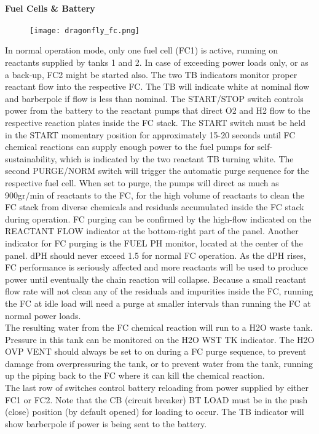 \documentclass[Orbiter User Manual.tex]{subfiles}
\begin{document}
\paragraph{Fuel Cells \& Battery}

\begin{figure}[H]
  \centering
  \texttt{[image: dragonfly\_fc.png]}
\end{figure}

\noindent
In normal operation mode, only one fuel cell (FC1) is active, running on reactants supplied by tanks 1 and 2. In case of exceeding power loads only, or as a back-up, FC2 might be started also. The two TB indicators monitor proper reactant flow into the respective FC. The TB will indicate white at nominal flow and barberpole if flow is less than nominal. The START/STOP switch controls power from the battery to the reactant pumps that direct O2 and H2 flow to the respective reaction plates inside the FC stack. The START switch must be held in the START momentary position for approximately 15-20 seconds until FC chemical reactions can supply enough power to the fuel pumps for self-sustainability, which is indicated by the two reactant TB turning white. The second PURGE/NORM switch will trigger the automatic purge sequence for the respective fuel cell. When set to purge, the pumps will direct as much as 900gr/min of reactants to the FC, for the high volume of reactants to clean the FC stack from diverse chemicals and residuals accumulated inside the FC stack during operation. FC purging can be confirmed by the high-flow indicated on the REACTANT FLOW indicator at the bottom-right part of the panel. Another indicator for FC purging is the FUEL PH monitor, located at the center of the panel. dPH should never exceed 1.5 for normal FC operation. As the dPH rises, FC performance is seriously affected and more reactants will be used to produce power until eventually the chain reaction will collapse. Because a small reactant flow rate will not clean any of the residuals and impurities inside the FC, running the FC at idle load will need a purge at smaller intervals than running the FC at normal power loads.\\
The resulting water from the FC chemical reaction will run to a H2O waste tank. Pressure in this tank can be monitored on the H2O WST TK indicator. The H2O OVP VENT should always be set to on during a FC purge sequence, to prevent damage from overpressuring the tank, or to prevent water from the tank, running up the piping back to the FC where it can kill the chemical reaction.\\
The last row of switches control battery reloading from power supplied by either FC1 or FC2. Note that the CB (circuit breaker) BT LOAD must be in the push (close) position (by default opened) for loading to occur. The TB indicator will show barberpole if power is being sent to the battery.
\end{document}
